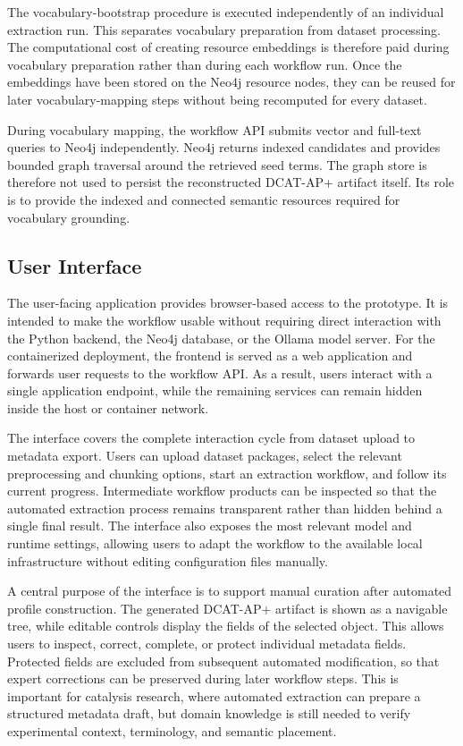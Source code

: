 The vocabulary-bootstrap procedure is executed independently of an individual extraction run.
This separates vocabulary preparation from dataset processing.
The computational cost of creating resource embeddings is therefore paid during vocabulary preparation rather than during each workflow run.
Once the embeddings have been stored on the Neo4j resource nodes, they can be reused for later vocabulary-mapping steps without being recomputed for every dataset.

During vocabulary mapping, the workflow \ac{API} submits vector and full-text queries to Neo4j independently.
Neo4j returns indexed candidates and provides bounded graph traversal around the retrieved seed terms.
The graph store is therefore not used to persist the reconstructed \ac{DCAT-AP+} artifact itself.
Its role is to provide the indexed and connected semantic resources required for vocabulary grounding.

\subsection{User Interface}
\label{sec:user_interface}

The user-facing application provides browser-based access to the prototype.
It is intended to make the workflow usable without requiring direct interaction with the Python backend, the Neo4j database, or the Ollama model server.
For the containerized deployment, the frontend is served as a web application and forwards user requests to the workflow \ac{API}.
As a result, users interact with a single application endpoint, while the remaining services can remain hidden inside the host or container network.

The interface covers the complete interaction cycle from dataset upload to metadata export.
Users can upload dataset packages, select the relevant preprocessing and chunking options, start an extraction workflow, and follow its current progress.
Intermediate workflow products can be inspected so that the automated extraction process remains transparent rather than hidden behind a single final result.
The interface also exposes the most relevant model and runtime settings, allowing users to adapt the workflow to the available local infrastructure without editing configuration files manually.

A central purpose of the interface is to support manual curation after automated profile construction.
The generated \ac{DCAT-AP+} artifact is shown as a navigable tree, while editable controls display the fields of the selected object.
This allows users to inspect, correct, complete, or protect individual metadata fields.
Protected fields are excluded from subsequent automated modification, so that expert corrections can be preserved during later workflow steps.
This is important for catalysis research, where automated extraction can prepare a structured metadata draft, but domain knowledge is still needed to verify experimental context, terminology, and semantic placement.

